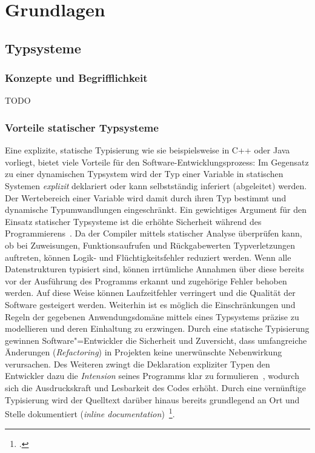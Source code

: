 \chapter{Grundlagen}
\label{chap:basics}

\section{Typsysteme}

\subsection{Konzepte und Begrifflichkeit}

TODO

\subsection{Vorteile statischer Typsysteme}

Eine explizite, statische Typisierung wie sie beispielsweise in C++ oder Java vorliegt, bietet viele Vorteile für den Software-Entwicklungsprozess: Im Gegensatz zu einer dynamischen Typsystem wird der Typ einer Variable in statischen Systemen \emph{explizit} deklariert oder kann selbstständig inferiert (abgeleitet) werden. Der Wertebereich einer Variable wird damit durch ihren Typ bestimmt und dynamische Typumwandlungen eingeschränkt.
Ein gewichtiges Argument für den Einsatz statischer Typsysteme ist die erhöhte Sicherheit während des Programmierens~\autocite{CORNELL:STRONG_TYPING}. Da der Compiler mittels statischer Analyse überprüfen kann, ob bei Zuweisungen, Funktionsaufrufen und Rückgabewerten Typverletzungen auftreten, können Logik- und Flüchtigkeitsfehler reduziert werden. Wenn alle Datenstrukturen typisiert sind, können irrtümliche Annahmen über diese bereits vor der Ausführung des Programms erkannt und zugehörige Fehler behoben werden. Auf diese Weise können Laufzeitfehler verringert und die Qualität der Software gesteigert werden. Weiterhin ist es möglich die Einschränkungen und Regeln der gegebenen Anwendungsdomäne mittels eines Typsystems präzise zu modellieren und deren Einhaltung zu erzwingen. Durch eine statische Typisierung gewinnen Software"=Entwickler die Sicherheit und Zuversicht, dass umfangreiche Änderungen (\textit{Refactoring}) in Projekten keine unerwünschte Nebenwirkung verursachen.
Des Weiteren zwingt die Deklaration expliziter Typen den Entwickler dazu die \emph{Intension} seines Programms klar zu formulieren~\autocite[96]{WALDMANN:PPS}, wodurch sich die Ausdruckskraft und Lesbarkeit des Codes erhöht. Durch eine vernünftige Typisierung wird der Quelltext darüber hinaus bereits grundlegend an Ort und Stelle dokumentiert (\textit{inline documentation})~\footcite[Abschnitt 6.1.1]{MITCHELL:CONCEPTS}.

